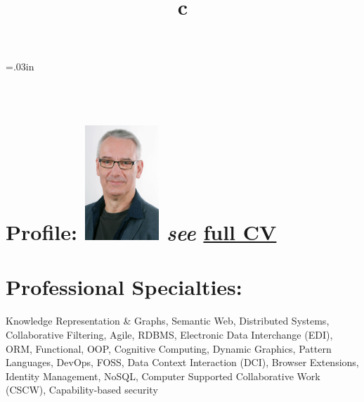 \documentclass[line,margin,hidelinks]{res}
\begin{document}


\resumewidth=7.2in
\sectionskip=.03in
\begin{resume}

\begin{format}
\title{c}\\
\end{format}


\section{Profile:
  \newline   \newline
  \includegraphics[width=1.1in]{smurp_smile_color.eps}
  \footnotesize{\textit{see} \href{https://smurp.com/smurp_cv.pdf}{full CV}}
}



\section{Professional Specialties:}
\begin{par}
Knowledge Representation \& Graphs,
Semantic Web,
Distributed Systems,
Collaborative Filtering,
Agile,
RDBMS,
Electronic Data Interchange (EDI),
ORM,
Functional,
OOP,
Cognitive Computing,
Dynamic Graphics,
Pattern Languages,
DevOps,
FOSS,
Data Context Interaction (DCI),
Browser Extensions,
Identity Management,
NoSQL,
Computer Supported Collaborative Work (CSCW),
Capability-based security
\end{par}


\end{resume}
\end{document}
